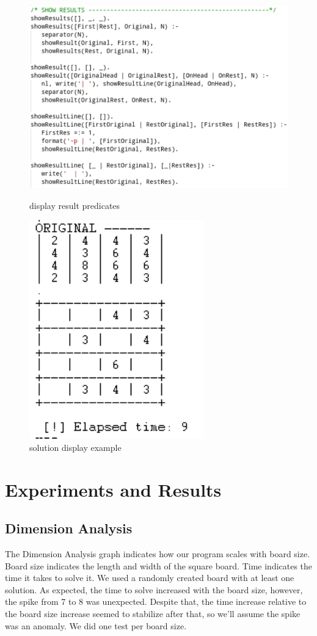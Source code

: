 \documentclass[runningheads]{llncs}
\begin{document}
\begin{figure}[h]
\includegraphics[scale=0.5]{showResults}
\centering
\caption{display result predicates}
\centering
\vspace{5mm}	
\includegraphics[scale=1]{solutionDisplay}
\centering
\caption{solution display example}
\centering
\end{figure}

\section{Experiments and Results}
\subsection{Dimension Analysis}
The Dimension Analysis graph indicates how our program scales with board size. Board size indicates the length and width of the square board.
Time indicates the time it takes to solve it.
We used a randomly created board with at least one solution.
As expected, the time to solve increased with the board size, however, the spike from 7 to 8 was unexpected. Despite that, the time increase relative to the board size increase seemed to stabilize after that, so we'll assume the spike was an anomaly.
We did one test per board size.
\end{document}

